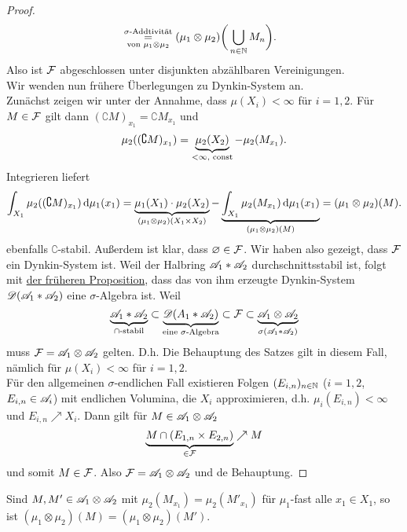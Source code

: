 \begin{satz}
\begin{proof}
\begin{equation*}
\begin{split}
&\underset{\te{von }\mu_1\otimes\mu_2}{\overset{\sigma\te{-Addtivität}}=} (\mu_1 \otimes \mu_2) \bigg( \bigcup_{n\in\N} M_n \bigg).
\end{split}
\end{equation*}
Also ist $\FF$ abgeschlossen unter disjunkten abzählbaren Vereinigungen. \vspace{0.5pc}\\
Wir wenden nun frühere Überlegungen zu Dynkin-System an. \vspace{0.5pc}\\
Zunächst zeigen wir unter der Annahme, dass $\mu(X_i)<\infty$ für $i=1,2$. Für $M\in\FF$ gilt dann $(\complement M)_{x_1}=\complement M_{x_1}$ und
$$\mu_2((\complement M)_{x_1})=\underbrace{\mu_2(X_2)}_{<\infty, \te{ const}}-\mu_2(M_{x_1}).$$
Integrieren liefert
$$\int_{X_1}\mu_2((\complement M)_{x_1})\D\mu_1(x_1)=\underbrace{\mu_1(X_1)\cdot \mu_2(X_2)}_{(\mu_1\otimes \mu_2)(X_1\times X_2)} -\underbrace{\int_{X_1}\mu_2(M_{x_1})\D\mu_1(x_1)}_{(\mu_1\otimes\mu_2) (M)}=(\mu_1 \otimes \mu_2)(M).$$
ebenfalls $\complement$-stabil. Außerdem ist klar, dass $\emptyset \in \FF$. Wir haben also gezeigt, dass $\FF$ ein Dynkin-System ist. Weil der Halbring $\AA_1 \ast \AA_2$ durchschnittsstabil ist, folgt mit \hyperref[durchschnittstabil-familie-erz]{der früheren Proposition}, dass das von ihm erzeugte Dynkin-System $\DD(\AA_1 \ast \AA_2)$ eine $\sigma$-Algebra ist. Weil
$$\underbrace{\AA_1 \ast \AA_2}_{\cap\te{-stabil}} \subset \underbrace{\DD(A_1\ast \AA_2)}_{\te{eine }\sigma\te{-Algebra}}\subset \FF \subset \underbrace{\AA_1 \otimes \AA_2}_{\sigma(\AA_1 \ast \AA_2)}$$
muss $\FF=\AA_1 \otimes \AA_2$ gelten. D.h. Die Behauptung des Satzes gilt in diesem Fall, nämlich für $\mu(X_i)<\infty$ für $i=1,2$. \vspace{0.5pc}\\
Für den allgemeinen $\sigma$-endlichen Fall existieren Folgen $(E_{i,n})_{n\in\N}$ ($i=1,2$, $E_{i,n}\in\AA_i$) mit endlichen Volumina, die $X_i$ approximieren, d.h. $\mu_i(E_{i,n})<\infty$ und $E_{i,n}\nearrow X_i$. Dann gilt für $M\in \AA_1 \otimes \AA_2$ 
$$\underbrace{M \cap (E_{1,n} \times E_{2,n})}_{\in \FF} \nearrow M$$
und somit $M\in\FF$. Also $\FF=\AA_1\otimes \AA_2$ und de Behauptung.
\end{proof}
\end{satz}

\begin{korollar}
\begin{mdframed}
Sind $M,M'\in \AA_1\otimes \AA_2$ mit $\mu_2(M_{x_1})=\mu_2(M'_{x_1})$ für $\mu_1$-fast alle $x_1 \in X_1$, so ist $(\mu_1\otimes\mu_2)(M)=(\mu_1\otimes\mu_2)(M').$
\end{mdframed}
\end{korollar}

